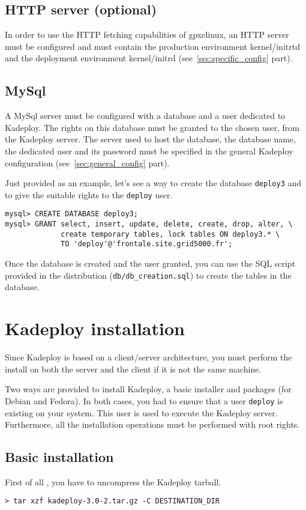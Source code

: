 \documentclass[a4wide,10pt,oneside]{book}
\begin{document}
\subsection{HTTP server (optional)}
In order to use the HTTP fetching capabilities of gpxelinux, an HTTP server must be configured and must contain the production environment kernel/initrtd and the deployment environment kernel/initrd (see~\ref{sec:specific_config} part).

\subsection{MySql}
A MySql server must be configured with a database and a user dedicated to Kadeploy. The rights on this database must be granted to the chosen user, from the Kadeploy server. The server used to host the database, the database name, the dedicated user and its password must be specified in the general Kadeploy configuration (see~\ref{sec:general_config} part).

Just provided as an example, let's see a way to create the database \texttt{deploy3} and to give the suitable rights to the \texttt{deploy} user.
\begin{verbatim}
mysql> CREATE DATABASE deploy3;
mysql> GRANT select, insert, update, delete, create, drop, alter, \
             create temporary tables, lock tables ON deploy3.* \
             TO 'deploy'@'frontale.site.grid5000.fr';
\end{verbatim}

Once the database is created and the user granted, you can use the SQL script provided in the distribution (\texttt{db/db\_creation.sql}) to create the tables in the database.

\section{Kadeploy installation}
Since Kadeploy is based on a client/server architecture, you must perform the install on both the server and the client if it is not the same machine.

Two ways are provided to install Kadeploy, a basic installer and packages (for Debian and Fedora). In both cases, you had to ensure that a user \texttt{deploy} is existing on your system. This user is used to execute the Kadeploy server. Furthermore, all the installation operations must be performed with root rights.

\subsection{Basic installation}
First of all , you have to uncompress the Kadeploy tarball.
\begin{small}
\begin{verbatim}
> tar xzf kadeploy-3.0-2.tar.gz -C DESTINATION_DIR
\end{verbatim}
\end{small}
\end{document}
